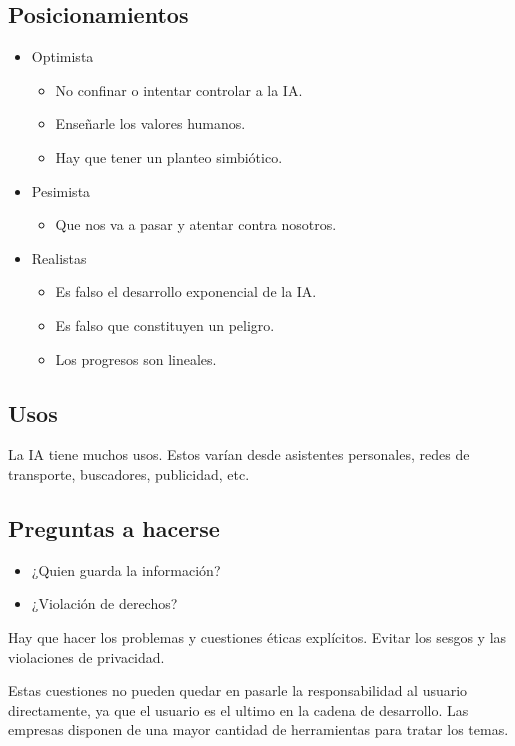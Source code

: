 \documentclass[titlepage,a4paper]{article}
\begin{document}
\subsection{Posicionamientos}
\begin{itemize}
    \item Optimista
    \begin{itemize}
        \item No confinar o intentar controlar a la IA.
        \item Enseñarle los valores humanos.
        \item Hay que tener un planteo simbiótico.
    \end{itemize}
    \item Pesimista
        \begin{itemize}
        \item Que nos va a pasar y atentar contra nosotros.
    \end{itemize}
    \item Realistas
        \begin{itemize}
        \item Es falso el desarrollo exponencial de la IA.
        \item Es falso que constituyen un peligro.
        \item Los progresos son lineales.
    \end{itemize}
\end{itemize}

\subsection{Usos}
La IA tiene muchos usos. Estos varían desde asistentes personales, redes de transporte, buscadores, publicidad, etc. 

\subsection{Preguntas a hacerse}
\begin{itemize}
    \item ¿Quien guarda la información?
    \item ¿Violación de derechos?
\end{itemize}

Hay que hacer los problemas y cuestiones éticas explícitos. Evitar los sesgos y las violaciones de privacidad.

Estas cuestiones no pueden quedar en pasarle la responsabilidad al usuario directamente, ya que el usuario es el ultimo en la cadena de desarrollo. Las empresas disponen de una mayor cantidad de herramientas para tratar los temas.
\end{document}
